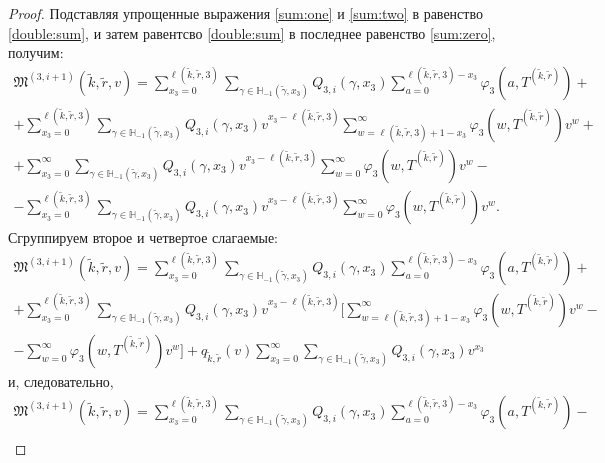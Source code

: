 \documentclass[a4paper,12pt,russian]{extarticle}
\begin{document}
\begin{proof}
Подставляя упрощенные выражения \eqref{sum:one} и \eqref{sum:two} в равенство \eqref{double:sum}, и затем равентсво \eqref{double:sum} в последнее равенство  \eqref{sum:zero}, получим:
\begin{multline*}
\mathfrak{M}^{(3,i+1)}(\tilde{k},\tilde{r},v) = \sum_{x_3=0}^{\ell(\tilde{k},\tilde{r},3)}\sum_{\gamma \in {\mathbb H}_{-1}(\tilde{\gamma},x_3)} Q_{3,i}(\gamma,x_3) \sum_{a=0}^{\ell(\tilde{k},\tilde{r},3) - x_3} \varphi_3(a,T^{(\tilde{k},\tilde{r})}) + \\
+ \sum_{x_3=0}^{\ell(\tilde{k},\tilde{r},3)}  \sum_{\gamma \in {\mathbb H}_{-1}(\tilde{\gamma},x_3)} Q_{3,i}(\gamma,x_3) v^{x_3-\ell(\tilde{k},\tilde{r},3)}  \sum_{w=\ell(\tilde{k},\tilde{r},3) + 1 -x_3}^{\infty}
\varphi_3(w,T^{(\tilde{k},\tilde{r})}) v^w + \\
+ \sum_{x_3=0}^{\infty} \sum_{\gamma \in {\mathbb H}_{-1}(\tilde{\gamma},x_3)} Q_{3,i}(\gamma,x_3) v^{x_3-\ell(\tilde{k},\tilde{r},3)}\sum_{w=0}^{\infty} 
\varphi_3(w,T^{(\tilde{k},\tilde{r})}) v^w - \\
- \sum_{x_3=0}^{\ell(\tilde{k},\tilde{r},3)} \sum_{\gamma \in {\mathbb H}_{-1}(\tilde{\gamma},x_3)} Q_{3,i}(\gamma,x_3) v^{x_3-\ell(\tilde{k},\tilde{r},3)}\sum_{w=0}^{\infty}  
\varphi_3(w,T^{(\tilde{k},\tilde{r})}) v^w.
\end{multline*}
Сгруппируем второе и четвертое слагаемые:
\begin{multline*}
\mathfrak{M}^{(3,i+1)}(\tilde{k},\tilde{r},v)= \sum_{x_3=0}^{\ell(\tilde{k},\tilde{r},3)}\sum_{\gamma \in {\mathbb H}_{-1}(\tilde{\gamma},x_3)} Q_{3,i}(\gamma,x_3) \sum_{a=0}^{\ell(\tilde{k},\tilde{r},3) - x_3} \varphi_3(a,T^{(\tilde{k},\tilde{r})}) + \\
+ \sum_{x_3=0}^{\ell(\tilde{k},\tilde{r},3)}  \sum_{\gamma \in {\mathbb H}_{-1}(\tilde{\gamma},x_3)} Q_{3,i}(\gamma,x_3) v^{x_3-\ell(\tilde{k},\tilde{r},3)}  [ \sum_{w=\ell(\tilde{k},\tilde{r},3) + 1 -x_3}^{\infty}
\varphi_3(w,T^{(\tilde{k},\tilde{r})}) v^w -\\-\sum_{w=0}^{\infty} 
\varphi_3(w,T^{(\tilde{k},\tilde{r})}) v^w ] 
+ q_{\tilde{k},\tilde{r}}(v) \sum_{x_3=0}^{\infty} \sum_{\gamma \in {\mathbb H}_{-1}(\tilde{\gamma},x_3)} Q_{3,i}(\gamma,x_3) v^{x_3}
\end{multline*}
и, следовательно,
\begin{multline}
\mathfrak{M}^{(3,i+1)}(\tilde{k},\tilde{r},v)= \sum_{x_3=0}^{\ell(\tilde{k},\tilde{r},3)}\sum_{\gamma \in {\mathbb H}_{-1}(\tilde{\gamma},x_3)} Q_{3,i}(\gamma,x_3) \sum_{a=0}^{\ell(\tilde{k},\tilde{r},3) - x_3} \varphi_3(a,T^{(\tilde{k},\tilde{r})}) - \\

\end{multline}
\end{proof}
\end{document}
